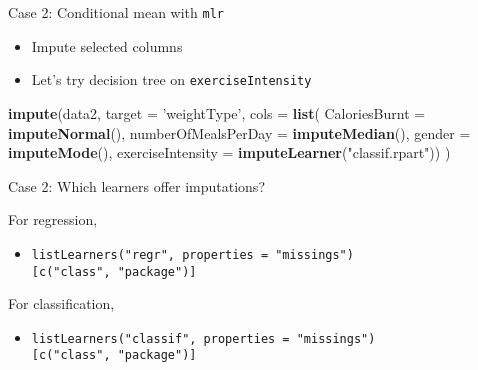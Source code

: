 \documentclass[ignorenonframetext,]{beamer}
\newenvironment{Shaded}{\begin{snugshade}}{\end{snugshade}}
\newcommand{\KeywordTok}[1]{\textcolor[rgb]{0.13,0.29,0.53}{\textbf{#1}}}
\newcommand{\DataTypeTok}[1]{\textcolor[rgb]{0.13,0.29,0.53}{#1}}
\newcommand{\StringTok}[1]{\textcolor[rgb]{0.31,0.60,0.02}{#1}}
\newcommand{\NormalTok}[1]{#1}
\providecommand{\tightlist}{%
  \setlength{\itemsep}{0pt}\setlength{\parskip}{0pt}}
\begin{document}
\begin{frame}[fragile]{Case 2: Conditional mean with \texttt{mlr}}

\begin{itemize}[<+->]
\tightlist
\item
  Impute selected columns
\item
  Let's try decision tree on \texttt{exerciseIntensity}
\end{itemize}

\begin{Shaded}
\begin{Highlighting}[]
\KeywordTok{impute}\NormalTok{(data2, }\DataTypeTok{target =} \StringTok{'weightType'}\NormalTok{, }
       \DataTypeTok{cols =} \KeywordTok{list}\NormalTok{(}
         \DataTypeTok{CaloriesBurnt       =} \KeywordTok{imputeNormal}\NormalTok{(),}
         \DataTypeTok{numberOfMealsPerDay =} \KeywordTok{imputeMedian}\NormalTok{(),}
         \DataTypeTok{gender              =} \KeywordTok{imputeMode}\NormalTok{(),}
         \DataTypeTok{exerciseIntensity   =} \KeywordTok{imputeLearner}\NormalTok{(}\StringTok{"classif.rpart"}\NormalTok{))}
\NormalTok{)}
\end{Highlighting}
\end{Shaded}

\end{frame}

\begin{frame}[fragile]{Case 2: Which learners offer imputations?}

For regression,

\begin{itemize}[<+->]
\tightlist
\item
  \texttt{listLearners("regr",\ properties\ =\ "missings"){[}c("class",\ "package"){]}}
\end{itemize}

For classification,

\begin{itemize}[<+->]
\tightlist
\item
  \texttt{listLearners("classif",\ properties\ =\ "missings"){[}c("class",\ "package"){]}}
\end{itemize}

\end{frame}
\end{document}

